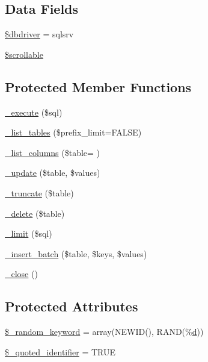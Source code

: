 \subsection*{Data Fields}
\begin{DoxyCompactItemize}
\item 
\hyperlink{class_c_i___d_b__sqlsrv__driver_a0cde2a16322a023d040aa7f725877597}{\$dbdriver} = \textquotesingle{}sqlsrv\textquotesingle{}
\item 
\hyperlink{class_c_i___d_b__sqlsrv__driver_a76095eacf021915db9aabc44ecf58555}{\$scrollable}
\end{DoxyCompactItemize}
\subsection*{Protected Member Functions}
\begin{DoxyCompactItemize}
\item 
\hyperlink{class_c_i___d_b__sqlsrv__driver_a114ab675d89bf8324a41785fb475e86d}{\+\_\+execute} (\$sql)
\item 
\hyperlink{class_c_i___d_b__sqlsrv__driver_a435c0f3ce54fe7daa178baa8532ebd54}{\+\_\+list\+\_\+tables} (\$prefix\+\_\+limit=F\+A\+L\+S\+E)
\item 
\hyperlink{class_c_i___d_b__sqlsrv__driver_a2a81bb476a5c76fe6f763b0557c1e4c2}{\+\_\+list\+\_\+columns} (\$table= \textquotesingle{}\textquotesingle{})
\item 
\hyperlink{class_c_i___d_b__sqlsrv__driver_a2540b03a93fa73ae74c10d0e16fc073e}{\+\_\+update} (\$table, \$values)
\item 
\hyperlink{class_c_i___d_b__sqlsrv__driver_aa029600528fc1ce660a23ff4b4667f95}{\+\_\+truncate} (\$table)
\item 
\hyperlink{class_c_i___d_b__sqlsrv__driver_a133ea8446ded52589bd22cc9163d0896}{\+\_\+delete} (\$table)
\item 
\hyperlink{class_c_i___d_b__sqlsrv__driver_a3a02ea06541b8ecc25a33a61651562c8}{\+\_\+limit} (\$sql)
\item 
\hyperlink{class_c_i___d_b__sqlsrv__driver_a1978e1358c812587a46e242630365099}{\+\_\+insert\+\_\+batch} (\$table, \$keys, \$values)
\item 
\hyperlink{class_c_i___d_b__sqlsrv__driver_a4d9082658000e5ede8312067c6dda9db}{\+\_\+close} ()
\end{DoxyCompactItemize}
\subsection*{Protected Attributes}
\begin{DoxyCompactItemize}
\item 
\hyperlink{class_c_i___d_b__sqlsrv__driver_a10213aa6e05f6d924d3277bb1d2fea00}{\$\+\_\+random\+\_\+keyword} = array(\textquotesingle{}N\+E\+W\+I\+D()\textquotesingle{}, \textquotesingle{}R\+A\+N\+D(\%\hyperlink{assets_2js_2bootstrap_8min_8js_aeb337d295abaddb5ec3cb34cc2e2bbc9}{d})\textquotesingle{})
\item 
\hyperlink{class_c_i___d_b__sqlsrv__driver_a1dae2f0e9ad7299438a9976d6cdbf2ad}{\$\+\_\+quoted\+\_\+identifier} = T\+R\+U\+E
\end{DoxyCompactItemize}


